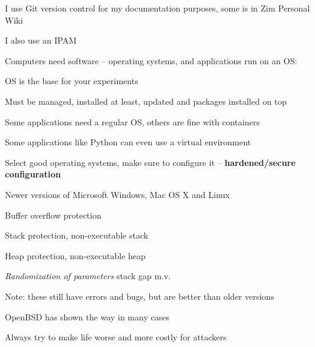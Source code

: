 \documentclass[Screen16to9,17pt]{foils}
\begin{document}
\begin{list2}
\item I use Git version control for my documentation purposes, some is in Zim Personal Wiki 
\item I also use an IPAM 
\end{list2}




Computers need software -- operating systems, and applications run on an OS:
\begin{list2}
\item OS is the base for your experiments
\item Must be managed, installed at least, updated and packages installed on top
\item Some applications need a regular OS, others are fine with containers
\item Some applications like Python can even use a virtual environment
\end{list2}

Select good operating systems, make sure to configure it -- \textbf{hardened/secure configuration}


\begin{list1}
\item Newer versions of Microsoft Windows, Mac OS X and Linux
\begin{list2}
\item Buffer overflow protection
\item Stack protection, non-executable stack
\item Heap protection, non-executable heap
\item \emph{Randomization of parameters} stack gap m.v.
\end{list2}
\item Note: these still have errors and bugs, but are better than older versions
\item OpenBSD has shown the way in many cases\\ 
\end{list1}

\vskip 1cm

\centerline{Always try to make life worse and more costly for attackers}
\end{document}
